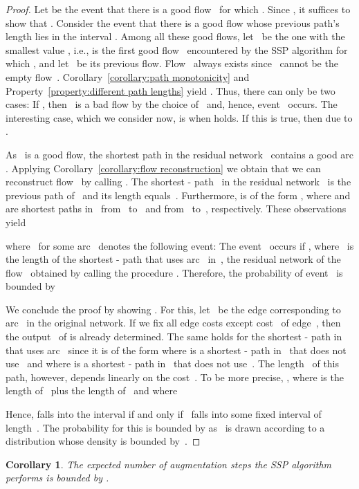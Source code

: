 \documentclass[11pt]{article}
\newtheorem{corollary}[theorem]{Corollary}
\begin{document}
\begin{proof}
Let  be the event that there is a good flow~ for which . Since , it suffices to show that . Consider the event that there is a good flow whose previous path's length lies in the interval . Among all these good flows, let~ be the one with the smallest value , i.e.,  is the first good flow~ encountered by the SSP algorithm for which , and let~ be its previous flow. Flow~ always exists since~ cannot be the empty flow~. Corollary~\ref{corollary:path monotonicity} and Property~\ref{property:different path lengths} yield . Thus, there can only be two cases: If , then~ is a bad flow by the choice of~ and, hence, event~ occurs. The interesting case, which we consider now, is when  holds. If this is true, then  due to .

As~ is a good flow, the shortest path in the residual network~ contains a good arc . Applying Corollary~\ref{corollary:flow reconstruction} we obtain that we can reconstruct flow~ by calling . The shortest - path~ in the residual network~ is the previous path of~ and its length equals~. Furthermore,  is of the form , where  and  are shortest paths in~ from~ to~ and from~ to~, respectively. These observations yield

where~ for some arc~ denotes the following event: The event~ occurs if , where~ is the length of the shortest - path that uses arc~ in~, the residual network of the flow~ obtained by calling the procedure . Therefore, the probability of event~ is bounded by

We conclude the proof by showing . For this, let~ be the edge corresponding to arc~ in the original network. If we fix all edge costs except cost~ of edge~, then the output~ of  is already determined. The same holds for the shortest - path in~ that uses arc~ since it is of the form  where  is a shortest - path in~ that does not use~ and where  is a shortest - path in~ that does not use~. The length~ of this path, however, depends linearly on the cost~. To be more precise, , where  is the length of~ plus the length of~ and where

Hence,  falls into the interval  if and only if~ falls into some fixed interval of length~. The probability for this is bounded by  as~ is drawn according to a distribution whose density is bounded by~. \end{proof}

\begin{corollary}
\label{corollary:expected number of SSP steps}
The expected number of augmentation steps the SSP algorithm performs is bounded by .
\end{corollary}
\end{document}
